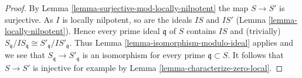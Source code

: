 \begin{proof}
By Lemma \ref{lemma-surjective-mod-locally-nilpotent} the map
$S \to S'$ is surjective. As $I$ is locally nilpotent, so are the
ideals $IS$ and $IS'$ (Lemma \ref{lemma-locally-nilpotent}). Hence
every prime ideal $\mathfrak q$ of $S$ contains $IS$ and (trivially)
$S_\mathfrak q/IS_\mathfrak q \cong S'_\mathfrak q/IS'_\mathfrak q$.
Thus Lemma \ref{lemma-isomorphism-modulo-ideal} applies
and we see that $S_\mathfrak q \to S'_\mathfrak q$ is an
isomorphism for every prime $\mathfrak q \subset S$.
It follows that $S \to S'$ is injective for example by
Lemma \ref{lemma-characterize-zero-local}.
\end{proof}





